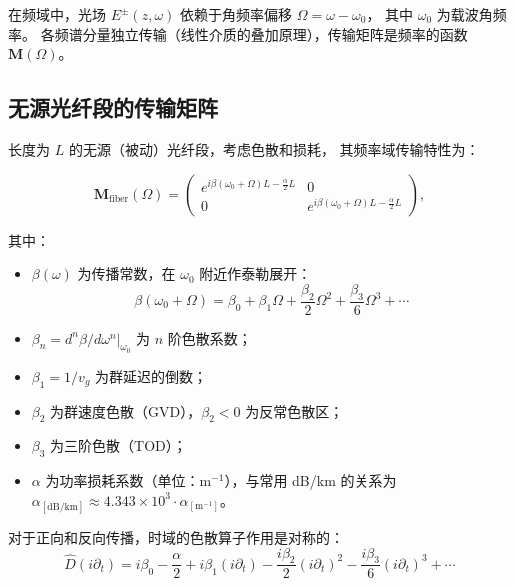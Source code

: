 \documentclass[11pt,a4paper]{ctexart}
\begin{document}
在频域中，光场 $E^\pm(z, \omega)$ 依赖于角频率偏移 $\Omega = \omega - \omega_0$，
其中 $\omega_0$ 为载波角频率。
各频谱分量独立传输（线性介质的叠加原理），传输矩阵是频率的函数 $\mathbf{M}(\Omega)$。

\subsection{无源光纤段的传输矩阵}

长度为 $L$ 的无源（被动）光纤段，考虑色散和损耗，
其频率域传输特性为：

\begin{equation}
  \mathbf{M}_{\text{fiber}}(\Omega) =
  \begin{pmatrix}
    e^{i\beta(\omega_0+\Omega)L - \frac{\alpha}{2}L} & 0 \\[4pt]
    0 & e^{i\beta(\omega_0+\Omega)L - \frac{\alpha}{2}L}
  \end{pmatrix},
  \label{eq:M_fiber}
\end{equation}

其中：
\begin{itemize}
  \item $\beta(\omega)$ 为传播常数，在 $\omega_0$ 附近作泰勒展开：
        \begin{equation}
          \beta(\omega_0 + \Omega) = \beta_0 + \beta_1\Omega + \frac{\beta_2}{2}\Omega^2 + \frac{\beta_3}{6}\Omega^3 + \cdots
          \label{eq:beta_expansion}
        \end{equation}
  \item $\beta_n = d^n\beta/d\omega^n|_{\omega_0}$ 为 $n$ 阶色散系数；
  \item $\beta_1 = 1/v_g$ 为群延迟的倒数；
  \item $\beta_2$ 为群速度色散（GVD），$\beta_2 < 0$ 为反常色散区；
  \item $\beta_3$ 为三阶色散（TOD）；
  \item $\alpha$ 为功率损耗系数（单位：m$^{-1}$），与常用 dB/km 的关系为
        $\alpha_{[\text{dB/km}]} \approx 4.343 \times 10^3 \cdot \alpha_{[\text{m}^{-1}]}$。
\end{itemize}

对于正向和反向传播，时域的色散算子作用是对称的：
\begin{equation}
  \hat{D}(i\partial_t) = i\beta_0 - \frac{\alpha}{2}
  + i\beta_1 (i\partial_t)
  - \frac{i\beta_2}{2}(i\partial_t)^2
  - \frac{i\beta_3}{6}(i\partial_t)^3 + \cdots
  \label{eq:dispersion_operator}
\end{equation}
\end{document}
